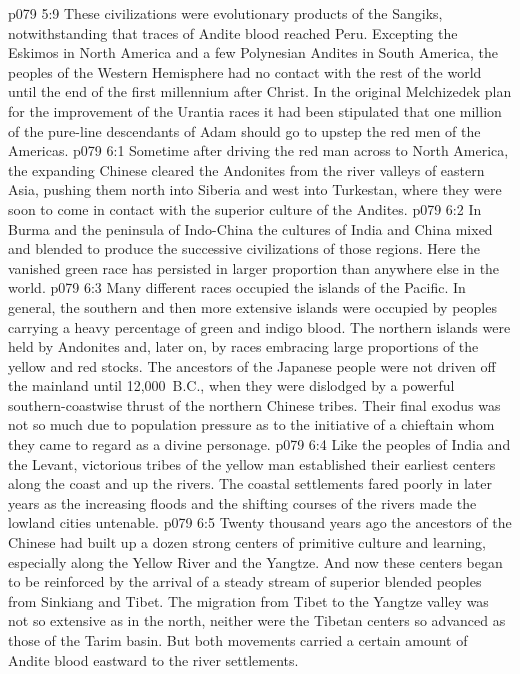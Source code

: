 \vs p079 5:9 These civilizations were evolutionary products of the Sangiks, notwithstanding that traces of Andite blood reached Peru. Excepting the Eskimos in North America and a few Polynesian Andites in South America, the peoples of the Western Hemisphere had no contact with the rest of the world until the end of the first millennium after Christ. In the original Melchizedek plan for the improvement of the Urantia races it had been stipulated that one million of the pure\hyp{}line descendants of Adam should go to upstep the red men of the Americas.
\vs p079 6:1 Sometime after driving the red man across to North America, the expanding Chinese cleared the Andonites from the river valleys of eastern Asia, pushing them north into Siberia and west into Turkestan, where they were soon to come in contact with the superior culture of the Andites.
\vs p079 6:2 In Burma and the peninsula of Indo\hyp{}China the cultures of India and China mixed and blended to produce the successive civilizations of those regions. Here the vanished green race has persisted in larger proportion than anywhere else in the world.
\vs p079 6:3 Many different races occupied the islands of the Pacific. In general, the southern and then more extensive islands were occupied by peoples carrying a heavy percentage of green and indigo blood. The northern islands were held by Andonites and, later on, by races embracing large proportions of the yellow and red stocks. The ancestors of the Japanese people were not driven off the mainland until 12,000~B.C., when they were dislodged by a powerful southern\hyp{}coastwise thrust of the northern Chinese tribes. Their final exodus was not so much due to population pressure as to the initiative of a chieftain whom they came to regard as a divine personage.\plusone
\vs p079 6:4 Like the peoples of India and the Levant, victorious tribes of the yellow man established their earliest centers along the coast and up the rivers. The coastal settlements fared poorly in later years as the increasing floods and the shifting courses of the rivers made the lowland cities untenable.
\vs p079 6:5 Twenty thousand years ago the ancestors of the Chinese had built up a dozen strong centers of primitive culture and learning, especially along the Yellow River and the Yangtze. And now these centers began to be reinforced by the arrival of a steady stream of superior blended peoples from Sinkiang and Tibet. The migration from Tibet to the Yangtze valley was not so extensive as in the north, neither were the Tibetan centers so advanced as those of the Tarim basin. But both movements carried a certain amount of Andite blood eastward to the river settlements.
